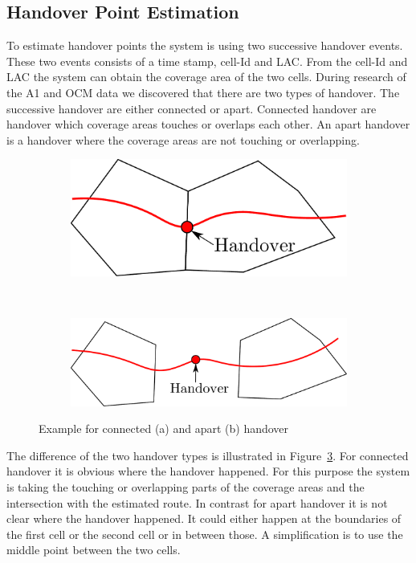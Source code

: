 \documentclass[master,english]{hgbthesis}
\begin{document}
\subsection{Handover Point Estimation}
To estimate handover points the system is using two successive handover events. These two events consists of a time stamp, cell-Id and LAC. From the cell-Id and LAC the system can obtain the coverage area of the two cells. During research of the A1 and OCM data we discovered that there are two types of handover. The successive handover are either connected or apart. Connected handover are handover which coverage areas touches or overlaps each other. An apart handover is a handover where the coverage areas are not touching or overlapping.
\begin{figure}
	\centering
	\begin{subfigure}[b]{0.4\textwidth}
		\includegraphics[width=\textwidth]{handover_together}
		\caption{}
		\label{fig:handovertogether}
	\end{subfigure}%
	~ %
	\begin{subfigure}[b]{0.55\textwidth}
		\includegraphics[width=\textwidth]{handover_apart}
		\caption{}
		\label{fig:handoverapart}
	\end{subfigure}
	\caption{Example for connected (a) and apart (b) handover}
	\label{fig:handovertypes}
\end{figure}
The difference of the two handover types is illustrated in Figure~\ref{fig:handovertypes}. For connected handover it is obvious where the handover happened. For this purpose the system is taking the touching or overlapping parts of the coverage areas and the intersection with the estimated route. In contrast for apart handover it is not clear where the handover happened. It could either happen at the boundaries of the first cell or the second cell or in between those. A simplification is to use the middle point between the two cells.
\end{document}

